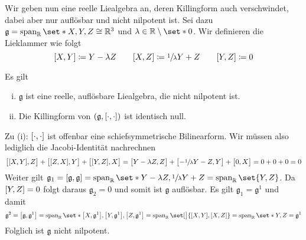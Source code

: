 Wir geben nun eine reelle Liealgebra an, deren Killingform auch verschwindet, dabei aber nur auflösbar und nicht nilpotent ist.
Sei dazu $\mathfrak{g} = \Span_{\mathbb{R}} \set*{X,Y,Z} \cong \mathbb{R}^3$ und $\lambda \in \mathbb{R}\setminus \set*{0}$.
Wir definieren die Lieklammer wie folgt
\[
	\benbrace*{X,Y} \coloneqq Y- \lambda Z  \qquad \benbrace*{X,Z} \coloneqq \sfrac{1}{\lambda}Y + Z \qquad \benbrace*{Y,Z} \coloneqq 0
\]
\begin{lemma}
	Es gilt
	\begin{enumerate}[(i)]
		\item $\mathfrak{g}$ ist eine reelle, auflösbare Liealgebra, die nicht nilpotent ist.
		\item Die Killingform von $(\mathfrak{g}, \benbrace*{\cdot,\cdot })$ ist identisch null.
	\end{enumerate}
\end{lemma}
\begin{beweis}
	Zu (i): $\benbrace*{\cdot,\cdot }$ ist offenbar eine schiefsymmetrische Bilinearform.
	Wir müssen also lediglich die Jacobi-Identität nachrechnen
	\[
		\benbrace[\big]{\benbrace*{X,Y},Z} + \benbrace[\big]{\benbrace*{Z,X},Y} + \benbrace[\big]{\benbrace*{Y,Z},X} = \benbrace[\big]{Y- \lambda Z,Z} + \benbrace[\big]{- \sfrac{1}{\lambda} Y - Z , Y} + \benbrace[\big]{0,X} 
		= 0 + 0 +0 = 0
	\]
	Weiter gilt $\mathfrak{g}_1 = \benbrace*{\mathfrak{g},\mathfrak{g}} = \Span_{\mathbb{R}}\set*{Y- \lambda Z,\sfrac{1}{\lambda}Y + Z} = \Span_{\mathbb{R}}\set{Y,Z}$.
	Da $\benbrace*{Y,Z}=0$ folgt daraus $\mathfrak{g}_2=0$ und somit ist $\mathfrak{g}$ auflösbar.
	Es gilt $\mathfrak{g}_1 = \mathfrak{g}^1$ und damit
	\begin{align}
		\mathfrak{g}^2 = \benbrace*{\mathfrak{g}, \mathfrak{g}^1} = \Span_{\mathbb{R}} \set*{\benbrace*{X,\mathfrak{g}^1}, \benbrace*{Y,\mathfrak{g}^1}, \benbrace*{Z,\mathfrak{g}^1}} = \Span_{\mathbb{R}} \set[\big]{\benbrace*{X,Y}, \benbrace*{X,Z}} = \Span_{\mathbb{R}} \set*{Y,Z} = \mathfrak{g}^1
	\end{align}
	Folglich ist $\mathfrak{g}$ nicht nilpotent.
	
\end{beweis}












